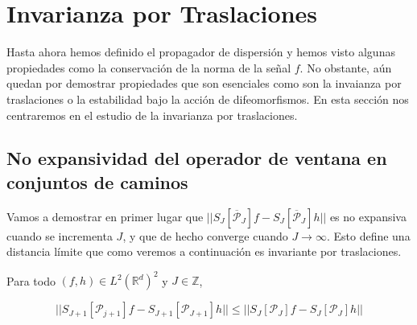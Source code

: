 \section{Invarianza por Traslaciones} \label{ch:seccion14}

\noindent Hasta ahora hemos definido el propagador de dispersión y hemos visto algunas propiedades como la conservación de la norma de la señal $f$. No obstante, aún quedan por demostrar propiedades que son esenciales como son la invaianza por traslaciones o la estabilidad bajo la acción de difeomorfismos. En esta sección nos centraremos en el estudio de la invarianza por traslaciones.

\subsection{No expansividad del operador de ventana en conjuntos de caminos}
Vamos a demostrar en primer lugar que $||S_J[\overline{\mathcal{P}}_J] f- S_J[\overline{\mathcal{P}}_J] h ||$ es no expansiva cuando se incrementa $J$, y que de hecho converge cuando $J \rightarrow \infty$. Esto define una distancia límite que como veremos a continuación es invariante por traslaciones.

\medskip

\begin{proposicion}
\noindent Para todo $(f,h) \in L^2(\mathbb{R}^d)^2$ y $J\in \mathbb{Z}$, 

\begin{equation} \label{eq::1.10}
  || S_{J+1} [\mathcal{P}_{j+1}]f- S_{J+1}[\mathcal{P}_{J+1}]h || \leq ||S_J[\mathcal{P}_J]f - S_J[\mathcal{P}_J]h || 
\end{equation}

\end{proposicion}

